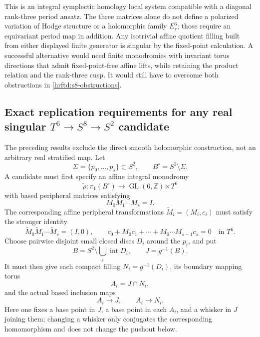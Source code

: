 This is an integral symplectic homology local system compatible with a
diagonal rank-three period ansatz.  The three matrices alone do not define a
polarized variation of Hodge structure or a holomorphic family
\(E_\tau^3\); those require an equivariant period map in addition.  Any
isotrivial affine quotient filling built from either displayed finite
generator is singular by the fixed-point calculation.  A successful
alternative would need finite
monodromies with invariant torus directions that admit fixed-point-free
affine lifts, while retaining the product relation and the rank-three cusp.
It would still have to overcome both obstructions in
\cref{hrftd:s8-obstructions}.

\subsection{Exact replication requirements for any real singular
\texorpdfstring{$T^6\to S^8\to S^2$}{T6 to S8 to S2} candidate}
\label{hrftd:replication}

The preceding results exclude the direct smooth holomorphic construction, not
an arbitrary real stratified map.  Let
\[
 \Sigma=\{p_0,\ldots,p_s\}\subset S^2,\qquad
 B^\circ=S^2\setminus\Sigma.
\]
A candidate must first specify an affine integral monodromy
\begin{equation}
 \widetilde\rho:\pi_1(B^\circ)\longrightarrow
 \operatorname{GL}(6,\mathbb Z)\ltimes T^6
 \label{hrftd:eq:affine-monodromy}
\end{equation}
with based peripheral matrices satisfying
\[
 M_0M_1\cdots M_s=I.
\]
The corresponding affine peripheral transformations
\(\widetilde M_i=(M_i,c_i)\) must satisfy the stronger identity
\begin{equation}
 \widetilde M_0\widetilde M_1\cdots\widetilde M_s=(I,0),
 \qquad
 c_0+M_0c_1+\cdots+M_0\cdots M_{s-1}c_s=0
 \quad\text{in }T^6.
 \label{hrftd:eq:affine-product}
\end{equation}
Choose pairwise disjoint small closed discs \(D_i\) around the \(p_i\), and
put
\[
 B=S^2\setminus\bigcup_i\operatorname{int}D_i,\qquad
 J=g^{-1}(B).
\]
It must then give each compact filling \(N_i=g^{-1}(D_i)\), its boundary
mapping torus
\[
 A_i=J\cap N_i,
\]
and the actual based inclusion maps
\[
 A_i\longrightarrow J,\qquad A_i\longrightarrow N_i.
\]
Here one fixes a base point in \(J\), a base point in each \(A_i\), and a
whisker in \(J\) joining them; changing a whisker only conjugates the
corresponding homomorphism and does not change the pushout below.

